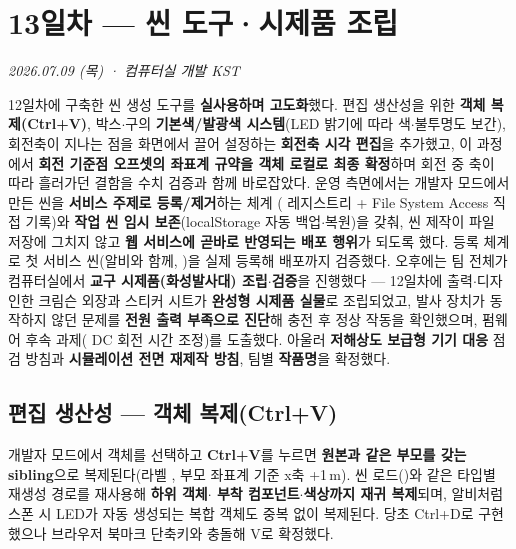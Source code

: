 \chapter{13일차 — 씬 도구·시제품 조립}
\textit{2026.07.09 (목) · 컴퓨터실 개발 KST}

\begin{summarybox}
12일차에 구축한 씬 생성 도구를 \textbf{실사용하며 고도화}했다. 편집 생산성을 위한
\textbf{객체 복제(Ctrl+V)}, 박스$\cdot$구의 \textbf{기본색/발광색 시스템}(LED 밝기에
따라 색$\cdot$불투명도 보간), 회전축이 지나는 점을 화면에서 끌어 설정하는 \textbf{회전축
시각 편집}을 추가했고, 이 과정에서 \textbf{회전 기준점 오프셋의 좌표계 규약을 객체
로컬로 최종 확정}하며 회전 중 축이 따라 흘러가던 결함을 수치 검증과 함께 바로잡았다.
운영 측면에서는 개발자 모드에서 만든 씬을 \textbf{서비스 주제로 등록/제거}하는 체계
( 레지스트리 + File System Access 직접 기록)와 \textbf{작업
씬 임시 보존}(localStorage 자동 백업$\cdot$복원)을 갖춰, 씬 제작이 파일 저장에 그치지
않고 \textbf{웹 서비스에 곧바로 반영되는 배포 행위}가 되도록 했다. 등록 체계로 첫
서비스 씬(알비와 함께, )을 실제 등록해 배포까지 검증했다.
오후에는 팀 전체가 컴퓨터실에서 \textbf{교구 시제품(화성발사대) 조립$\cdot$검증}을
진행했다 --- 12일차에 출력$\cdot$디자인한 크림슨 외장과 스티커 시트가 \textbf{완성형
시제품 실물}로 조립되었고, 발사 장치가 동작하지 않던 문제를 \textbf{전원 출력 부족으로
진단}해 충전 후 정상 작동을 확인했으며, 펌웨어 후속 과제( DC 회전
시간 조정)를 도출했다. 아울러 \textbf{저해상도 보급형 기기 대응} 점검 방침과 \textbf{시뮬레이션
전면 재제작 방침}, 팀별 \textbf{작품명}을 확정했다.
\end{summarybox}

\smallskip
{}

\section{편집 생산성 --- 객체 복제(Ctrl+V)}
개발자 모드에서 객체를 선택하고 \textbf{Ctrl+V}를 누르면 \textbf{원본과 같은 부모를
갖는 sibling}으로 복제된다(라벨 , 부모 좌표계 기준 x축 +1\,m).
씬 로드()와 같은 타입별 재생성 경로를 재사용해 \textbf{하위 객체$\cdot$%
부착 컴포넌트$\cdot$색상까지 재귀 복제}되며, 알비처럼 스폰 시 LED가 자동 생성되는
복합 객체도 중복 없이 복제된다. 당초 Ctrl+D로 구현했으나 브라우저 북마크 단축키와
충돌해 V로 확정했다.

